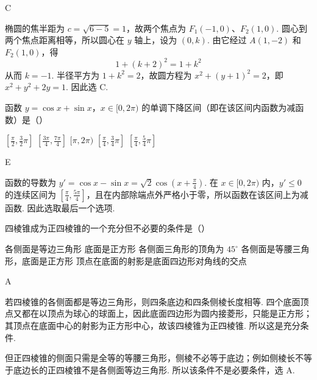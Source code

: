 \documentclass[UTF8,a4paper,oneside,11pt]{ctexbook}
\begin{document}
\begin{answer}
C
\end{answer}

\begin{solution}
椭圆的焦半距为 \(c=\sqrt{6-5}=1\)，故两个焦点为 \(F_1(-1,0)\)、\(F_2(1,0)\). 圆心到两个焦点距离相等，所以圆心在 \(y\) 轴上，设为 \((0,k)\). 由它经过 \(A(1,-2)\) 和 \(F_2(1,0)\)，得
\[
1+(k+2)^2=1+k^2
\]
从而 \(k=-1\). 半径平方为 \(1+k^2=2\)，故圆方程为 \(x^2+(y+1)^2=2\)，即 \(x^2+y^2+2y=1\). 因此选 C.
\end{solution}


\begin{problem}

函数 \(y = \cos x + \sin x\)，\(x \in [0, 2\pi)\) 的单调下降区间（即在该区间内函数为减函数）是（\quad）

\choicesfive
    {\(\left[\frac{\pi}{2},\frac{3}{2}\pi\right]\)}
    {\(\left[\frac{3\pi}{4},\frac{7\pi}{4}\right]\)}
    {\([\pi, 2\pi)\)}
    {\(\left[\frac{\pi}{4},\frac{3}{4}\pi\right]\)}
    {\(\left[\frac{\pi}{4},\frac{5}{4}\pi\right]\)}
\end{problem}

\begin{answer}
E
\end{answer}

\begin{solution}
函数的导数为 \(y'=\cos x-\sin x=\sqrt{2}\cos\left(x+\frac{\pi}{4}\right)\). 在 \(x\in[0,2\pi)\) 内，\(y'\leq0\) 的连续区间为 \([\frac{\pi}{4},\frac{5\pi}{4}]\)，且在内部除端点外严格小于零，所以函数在该区间上为减函数. 因此选取最后一个选项.
\end{solution}


\begin{problem}

四棱锥成为正四棱锥的一个充分但不必要的条件是（\quad）

\choicesfive
    {各侧面是等边三角形}
    {底面是正方形}
    {各侧面三角形的顶角为 \(45^{\circ}\)}
    {各侧面是等腰三角形，底面是正方形}
    {顶点在底面的射影是底面四边形对角线的交点}
\end{problem}

\begin{answer}
A
\end{answer}

\begin{solution}
若四棱锥的各侧面都是等边三角形，则四条底边和四条侧棱长度相等. 四个底面顶点又都在以顶点为球心的球面上，因此底面四边形为圆内接菱形，只能是正方形；其顶点在底面中心的射影为正方形中心，故该四棱锥为正四棱锥. 所以这是充分条件.

但正四棱锥的侧面只需是全等的等腰三角形，侧棱不必等于底边；例如侧棱长不等于底边长的正四棱锥不是各侧面等边三角形. 所以该条件不是必要条件，选 A.
\end{solution}
\end{document}
